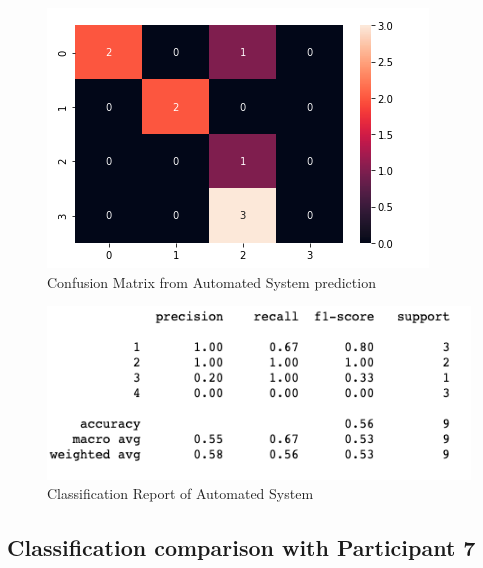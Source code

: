 \pagebreak

\begin{figure}[!htp]
    \includegraphics[width=\textwidth]{Images/a6.png}
    \caption{Confusion Matrix from Automated System prediction}
    \label{fig:f11}
\end{figure}

\begin{figure}[!htp]
    \includegraphics[width=\textwidth]{Images/a6r.png}
    \caption{Classification Report of Automated System}
    \label{fig:f11}
\end{figure}


\pagebreak
\subsection*{Classification comparison with Participant 7}


